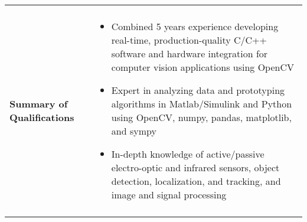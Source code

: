 \begin{tabular}{L{\lcolw}  L{\rcolw}}
 \hline \hline \\
\textbf{\Large Summary of Qualifications} &
\vspace{-0.3in} 
    \begin{itemize}[leftmargin = \itemmargin]

	\item Combined 5 years experience developing real-time, production-quality C/C++ software and hardware integration for computer vision applications using OpenCV
	
	\item Expert in analyzing data and prototyping algorithms in Matlab/Simulink and Python using OpenCV, numpy, pandas, matplotlib, and sympy

	\item In-depth knowledge of active/passive electro-optic and infrared sensors, object detection, localization, and tracking, and image and signal processing
		
	\end{itemize}\\
 \hline \\ 
\end{tabular}